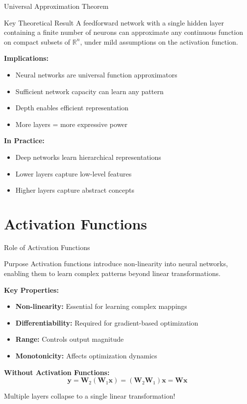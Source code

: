 \documentclass[aspectratio=169,10pt]{beamer}
\begin{document}
\begin{frame}{Universal Approximation Theorem}
\begin{alertblock}{Key Theoretical Result}
A feedforward network with a single hidden layer containing a finite number of neurons can approximate any continuous function on compact subsets of $\mathbb{R}^n$, under mild assumptions on the activation function.
\end{alertblock}

\textbf{Implications:}
\begin{itemize}
\item Neural networks are universal function approximators
\item Sufficient network capacity can learn any pattern
\item Depth enables efficient representation
\item More layers = more expressive power
\end{itemize}

\textbf{In Practice:}
\begin{itemize}
\item Deep networks learn hierarchical representations
\item Lower layers capture low-level features
\item Higher layers capture abstract concepts
\end{itemize}
\end{frame}

\section{Activation Functions}

\begin{frame}{Role of Activation Functions}
\begin{alertblock}{Purpose}
Activation functions introduce non-linearity into neural networks, enabling them to learn complex patterns beyond linear transformations.
\end{alertblock}

\textbf{Key Properties:}
\begin{itemize}
\item \textbf{Non-linearity:} Essential for learning complex mappings
\item \textbf{Differentiability:} Required for gradient-based optimization
\item \textbf{Range:} Controls output magnitude
\item \textbf{Monotonicity:} Affects optimization dynamics
\end{itemize}

\textbf{Without Activation Functions:}
$$\mathbf{y} = \mathbf{W}_2(\mathbf{W}_1\mathbf{x}) = (\mathbf{W}_2\mathbf{W}_1)\mathbf{x} = \mathbf{W}\mathbf{x}$$

Multiple layers collapse to a single linear transformation!
\end{frame}
\end{document}
